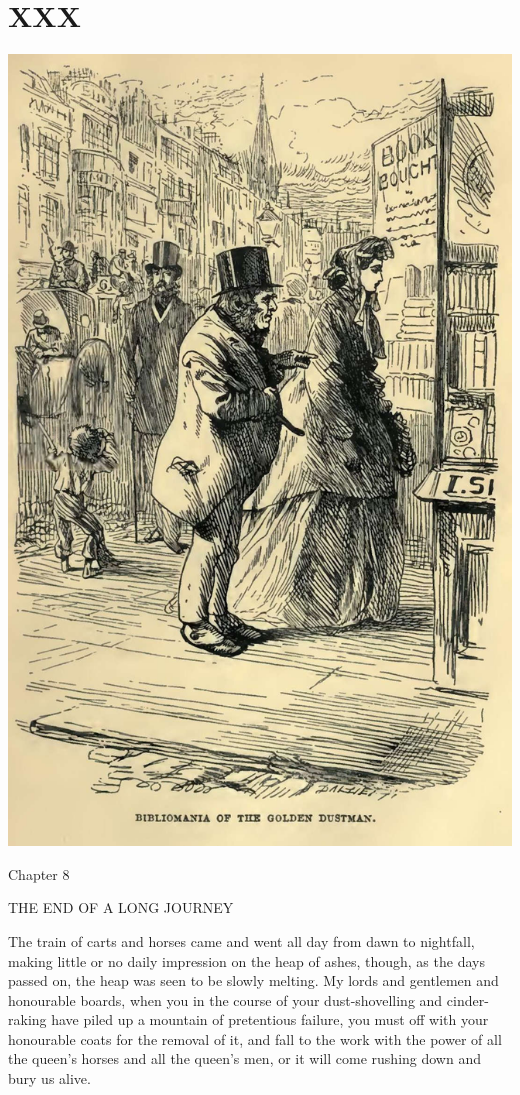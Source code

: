 
\chapter{XXX}

\includegraphics[scale=2.3]{03-05-01}

Chapter 8

THE END OF A LONG JOURNEY


The train of carts and horses came and went all day from dawn to
nightfall, making little or no daily impression on the heap of ashes,
though, as the days passed on, the heap was seen to be slowly melting.
My lords and gentlemen and honourable boards, when you in the course
of your dust-shovelling and cinder-raking have piled up a mountain of
pretentious failure, you must off with your honourable coats for the
removal of it, and fall to the work with the power of all the queen’s
horses and all the queen’s men, or it will come rushing down and bury us
alive.

